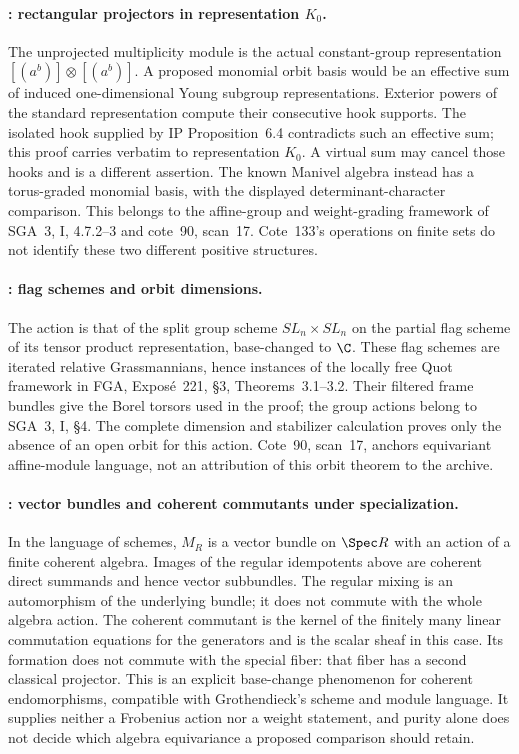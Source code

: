\paragraph{: rectangular projectors in representation $K_0$.}
The unprojected multiplicity module is the actual constant-group
representation $[(a^b)]\otimes[(a^b)]$. A proposed monomial orbit
basis would be an effective sum of induced one-dimensional Young
subgroup representations. Exterior powers of the standard
representation compute their consecutive hook supports. The
isolated hook supplied by IP Proposition~6.4 contradicts such an
effective sum; this proof carries verbatim to representation $K_0$.
A virtual sum may cancel those hooks and is a different assertion.
The known Manivel algebra instead has a torus-graded monomial basis,
with the displayed determinant-character comparison. This belongs
to the affine-group and weight-grading framework of SGA~3, I,
4.7.2--3 and cote~90, scan~17. Cote~133's operations on finite sets
do not identify these two different positive structures.


\paragraph{: flag schemes and orbit dimensions.}
The action is that of the split group scheme $SL_n\times SL_n$ on
the partial flag scheme of its tensor product representation,
base-changed to $\C$. These flag schemes are iterated relative
Grassmannians, hence instances of the locally free Quot framework
in FGA, Expos\'e~221, \S3, Theorems~3.1--3.2. Their filtered
frame bundles give the Borel torsors used in the proof; the group
actions belong to SGA~3, I, \S4. The complete dimension and
stabilizer calculation proves only the absence of an open orbit for
this action. Cote~90, scan~17, anchors equivariant affine-module
language, not an attribution of this orbit theorem to the archive.

\paragraph{: vector bundles and coherent commutants under specialization.}
In the language of schemes, $M_R$ is a vector bundle on $\Spec R$
with an action of a finite coherent algebra. Images of the regular
idempotents above are coherent direct summands and hence vector
subbundles. The regular mixing is an automorphism of the underlying
bundle; it does not commute with the whole algebra action. The coherent
commutant is the kernel of the finitely many linear commutation
equations for the generators and is the scalar sheaf in this case.
Its formation does not commute with the special fiber: that fiber
has a second classical projector. This is an explicit base-change
phenomenon for coherent endomorphisms, compatible with Grothendieck's
scheme and module language. It supplies neither a Frobenius action nor
a weight statement, and purity alone does not decide which algebra
equivariance a proposed comparison should retain.

